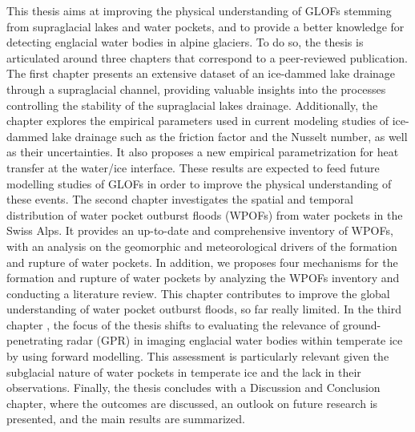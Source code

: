 This thesis aims at improving the physical understanding of GLOFs stemming from supraglacial lakes and water pockets, and to provide a better knowledge for detecting englacial water bodies in alpine glaciers. To do so, the thesis is articulated around three chapters that correspond to a peer-reviewed publication.
The first chapter \cite{Ogier&al2021} presents an extensive dataset of an ice-dammed lake drainage through a supraglacial channel, providing valuable insights into the processes controlling the stability of the supraglacial lakes drainage. Additionally, the chapter explores the empirical parameters used in current modeling studies of ice-dammed lake drainage such as the friction factor and the Nusselt number, as well as their uncertainties. It also proposes a new empirical parametrization for heat transfer at the water/ice interface. These results are expected to feed future modelling studies of GLOFs in order to improve the physical understanding of these events.
The second chapter  investigates the spatial and temporal distribution of water pocket outburst floods (WPOFs) from water pockets in the Swiss Alps. It provides an up-to-date and comprehensive inventory of WPOFs, with an analysis on the geomorphic and meteorological drivers of the formation and rupture of water pockets. In addition, we proposes four mechanisms for the formation and rupture of water pockets by analyzing the WPOFs inventory and conducting a literature review. This chapter contributes to improve the global understanding of water pocket outburst floods, so far really limited.
In the third chapter \citep{Ogier&al2023}, the focus of the thesis shifts to evaluating the relevance of ground-penetrating radar (GPR) in imaging englacial water bodies within temperate ice by using forward modelling. This assessment is particularly relevant given the subglacial nature of water pockets in temperate ice and the lack in their observations.
Finally, the thesis concludes with a Discussion and Conclusion chapter, where the outcomes are discussed, an outlook on future research is presented, and the main results are summarized.